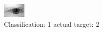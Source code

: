 \begin{figure}[h!]
\begin{center}
\includegraphics[width=0.60\columnwidth]{figures/ID420_class_1_target_2.png}
\end{center}
\caption{ Classification: 1 actual target: 2}
\label{fig:ID420_class_1_target_2}
\end{figure}
